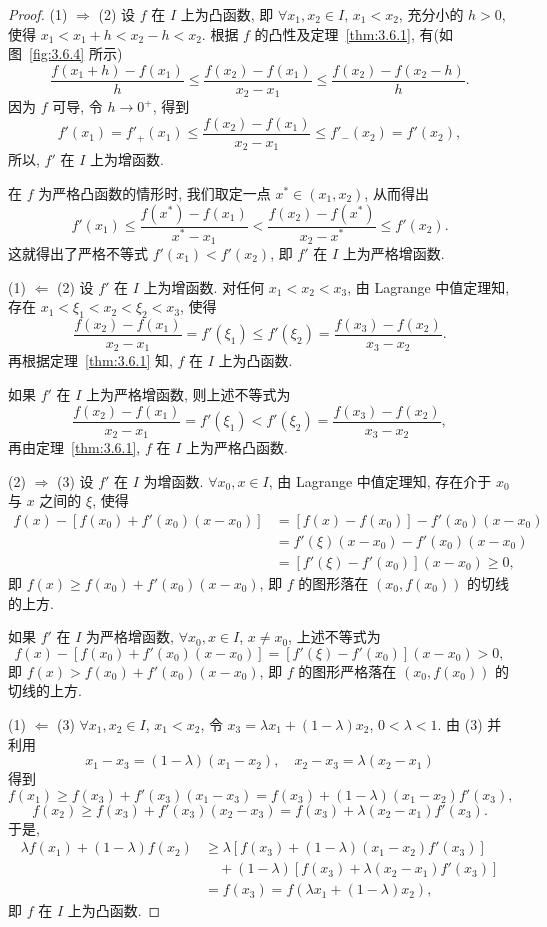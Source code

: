 \begin{proof}
(1) $\Longrightarrow$ (2) 设 $f$ 在 $I$ 上为凸函数, 即 $\forall x_{1},x_{2}\in I$, $x_{1}<x_{2}$, 充分小的 $h>0$, 使得 $x_{1}<x_{1}+h<x_{2}-h<x_{2}$. 根据 $f$ 的凸性及定理~\ref{thm:3.6.1}, 有(如图~\ref{fig:3.6.4} 所示)
\[
\frac{f(x_{1}+h)-f(x_{1})}{h}\leqslant\frac{f(x_{2})-f(x_{1})}{x_{2}-x_{1}}\leqslant\frac{f(x_{2})-f(x_{2}-h)}{h}.
\]
因为 $f$ 可导, 令 $h\to 0^{+}$, 得到
\[
f'(x_{1})=f'_{+}(x_{1})\leqslant\frac{f(x_{2})-f(x_{1})}{x_{2}-x_{1}}\leqslant f'_{-}(x_{2})=f'(x_{2}),
\]
所以, $f'$ 在 $I$ 上为增函数.

在 $f$ 为严格凸函数的情形时, 我们取定一点 $x^{*}\in (x_{1},x_{2})$, 从而得出
\[
f'(x_{1})\leqslant\frac{f(x^{*})-f(x_{1})}{x^{*}-x_{1}}<\frac{f(x_{2})-f(x^{*})}{x_{2}-x^{*}}\leqslant f'(x_{2}).
\]
这就得出了严格不等式 $f'(x_{1})<f'(x_{2})$, 即 $f'$ 在 $I$ 上为严格增函数.

(1) $\Longleftarrow$ (2) 设 $f'$ 在 $I$ 上为增函数. 对任何 $x_{1}<x_{2}<x_{3}$, 由 Lagrange 中值定理知, 存在 $x_{1}<\xi_{1}<x_{2}<\xi_{2}<x_{3}$, 使得
\[
\frac{f(x_{2})-f(x_{1})}{x_{2}-x_{1}}=f'(\xi_{1})\leqslant f'(\xi_{2})=\frac{f(x_{3})-f(x_{2})}{x_{3}-x_{2}}.
\]
再根据定理~\ref{thm:3.6.1} 知, $f$ 在 $I$ 上为凸函数.

如果 $f'$ 在 $I$ 上为严格增函数, 则上述不等式为
\[
\frac{f(x_{2})-f(x_{1})}{x_{2}-x_{1}}=f'(\xi_{1})<f'(\xi_{2})=\frac{f(x_{3})-f(x_{2})}{x_{3}-x_{2}},
\]
再由定理~\ref{thm:3.6.1}, $f$ 在 $I$ 上为严格凸函数.

(2) $\Longrightarrow$ (3) 设 $f'$ 在 $I$ 为增函数. $\forall x_{0},x\in I$, 由 Lagrange 中值定理知, 存在介于 $x_{0}$ 与 $x$ 之间的 $\xi$, 使得
\begin{align*}
f(x)-[f(x_{0})+f'(x_{0})(x-x_{0})]&=[f(x)-f(x_{0})]-f'(x_{0})(x-x_{0})\\
&=f'(\xi)(x-x_{0})-f'(x_{0})(x-x_{0})\\
&=[f'(\xi)-f'(x_{0})](x-x_{0})\geqslant 0,
\end{align*}
即 $f(x)\geqslant f(x_{0})+f'(x_{0})(x-x_{0})$, 即 $f$ 的图形落在 $(x_{0},f(x_{0}))$ 的切线的上方.

如果 $f'$ 在 $I$ 为严格增函数, $\forall x_{0},x\in I$, $x\neq x_{0}$, 上述不等式为
\[
f(x)-[f(x_{0})+f'(x_{0})(x-x_{0})]=[f'(\xi)-f'(x_{0})](x-x_{0})>0,
\]
即 $f(x)>f(x_{0})+f'(x_{0})(x-x_{0})$, 即 $f$ 的图形严格落在 $(x_{0},f(x_{0}))$ 的切线的上方.

(1) $\Longleftarrow$ (3) $\forall x_{1},x_{2}\in I$, $x_{1}<x_{2}$, 令 $x_{3}=\lambda x_{1}+(1-\lambda)x_{2}$, $0<\lambda<1$. 由 (3) 并利用
\[
x_{1}-x_{3}=(1-\lambda)(x_{1}-x_{2}),\quad x_{2}-x_{3}=\lambda(x_{2}-x_{1})
\]
得到
\[
f(x_{1})\geqslant f(x_{3})+f'(x_{3})(x_{1}-x_{3})=f(x_{3})+(1-\lambda)(x_{1}-x_{2})f'(x_{3}),
\]
\[
f(x_{2})\geqslant f(x_{3})+f'(x_{3})(x_{2}-x_{3})=f(x_{3})+\lambda(x_{2}-x_{1})f'(x_{3}).
\]
于是,
\begin{align*}
\lambda f(x_{1})+(1-\lambda)f(x_{2})&\geqslant \lambda[f(x_{3})+(1-\lambda)(x_{1}-x_{2})f'(x_{3})]\\
&\quad +(1-\lambda)[f(x_{3})+\lambda(x_{2}-x_{1})f'(x_{3})]\\
&=f(x_{3})=f(\lambda x_{1}+(1-\lambda)x_{2}),
\end{align*}
即 $f$ 在 $I$ 上为凸函数.


\end{proof}
